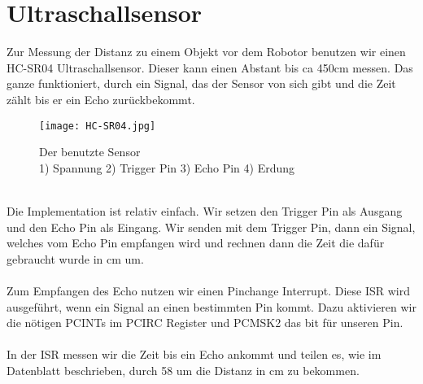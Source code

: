 \documentclass[12pt]{article}
\begin{document}
\section{Ultraschallsensor} %
Zur Messung der Distanz zu einem Objekt vor dem Robotor benutzen wir einen HC-SR04 Ultraschallsensor. Dieser kann einen Abstant bis ca 450cm messen. Das ganze funktioniert, durch ein Signal, das der Sensor von sich gibt und die Zeit zählt bis er ein Echo zurückbekommt.\\
\begin{figure}[h]
	\texttt{[image: HC-SR04.jpg]}
	\centering
	\caption{Der benutzte Sensor \\1) Spannung 2) Trigger Pin 3) Echo Pin 4) Erdung}
\end{figure} 
\\
Die Implementation ist relativ einfach. Wir setzen den Trigger Pin als Ausgang und den Echo Pin als Eingang. Wir senden mit dem Trigger Pin, dann ein Signal, welches vom Echo Pin empfangen wird und rechnen dann die Zeit die dafür gebraucht wurde in cm um.\\
\\
Zum Empfangen des Echo nutzen wir einen Pinchange Interrupt. Diese ISR wird ausgeführt, wenn ein Signal an einen bestimmten Pin kommt. Dazu aktivieren wir die nötigen PCINTs im PCIRC Register und PCMSK2 das bit für unseren Pin.\\
\\
In der ISR messen wir die Zeit bis ein Echo ankommt und teilen es, wie im Datenblatt beschrieben, durch 58 um die Distanz in cm zu bekommen.
\end{document}
